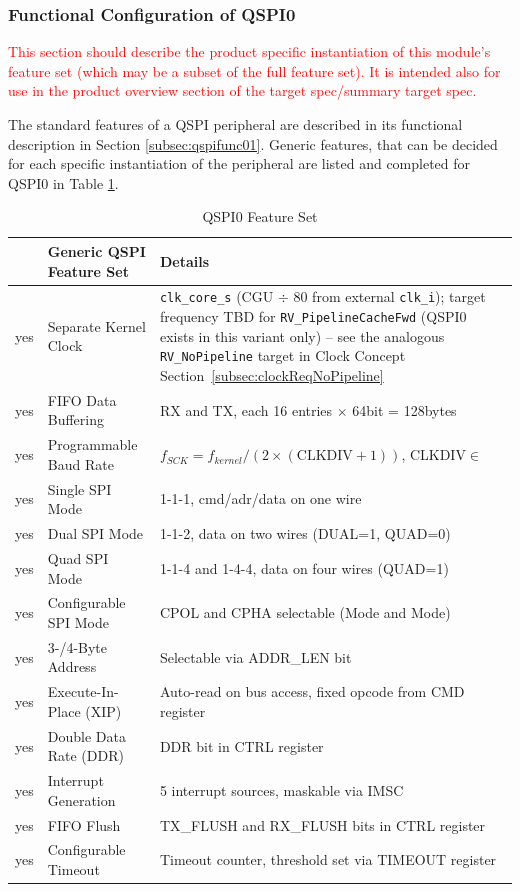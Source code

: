 \subsubsection{Functional Configuration of QSPI0}
\textcolor{red}{This section should describe the product specific instantiation of this module’s feature set (which may be a subset of the full feature set). It is intended also for use in the product overview section of the target spec/summary target spec.}

The standard features of a QSPI peripheral are described in its functional description in Section \ref{subsec:qspifunc01}. Generic features, that can be decided for each specific instantiation of the peripheral are listed and completed for QSPI0 in Table \ref{tab:asQspiPer01a}.
\begin{table}[H]
\caption{QSPI0 Feature Set}
\label{tab:asQspiPer01a}
\centering
\begin{tabularx}{\textwidth}{|l |l |X|}
  \hline
   & Generic QSPI Feature Set & Details \\
  \hline
  \hline
  yes & Separate Kernel Clock      & \texttt{clk\_core\_s} (CGU $\div$ 80 from external \texttt{clk\_i});
    target frequency TBD for \texttt{RV\_PipelineCacheFwd} (QSPI0 exists in
    this variant only) -- see the analogous \texttt{RV\_NoPipeline} target
    in Clock Concept Section~\ref{subsec:clockReqNoPipeline} \\
  \hline
  yes & FIFO Data Buffering        & RX and TX, each 16 entries $\times$ 64\;bit = 128\;bytes \\
  \hline
  yes & Programmable Baud Rate     & $f_{SCK} = f_{kernel} / (2 \times (\text{CLKDIV} + 1))$, CLKDIV\;$\in$\;[0\ldots255] \\
  \hline
  yes & Single SPI Mode            & 1-1-1, cmd/adr/data on one wire \\
  \hline
  yes & Dual SPI Mode              & 1-1-2, data on two wires (DUAL=1, QUAD=0) \\
  \hline
  yes & Quad SPI Mode              & 1-1-4 and 1-4-4, data on four wires (QUAD=1) \\
  \hline
  yes & Configurable SPI Mode      & CPOL and CPHA selectable (Mode\;0 and Mode\;3) \\
  \hline
  yes & 3-/4-Byte Address          & Selectable via ADDR\_LEN bit \\
  \hline
  yes & Execute-In-Place (XIP)     & Auto-read on bus access, fixed opcode from CMD register \\
  \hline
  yes & Double Data Rate (DDR)     & DDR bit in CTRL register \\
  \hline
  yes & Interrupt Generation       & 5 interrupt sources, maskable via IMSC \\
  \hline
  yes & FIFO Flush                 & TX\_FLUSH and RX\_FLUSH bits in CTRL register \\
  \hline
  yes & Configurable Timeout       & Timeout counter, threshold set via TIMEOUT register \\
  \hline
\end{tabularx}
\end{table}

